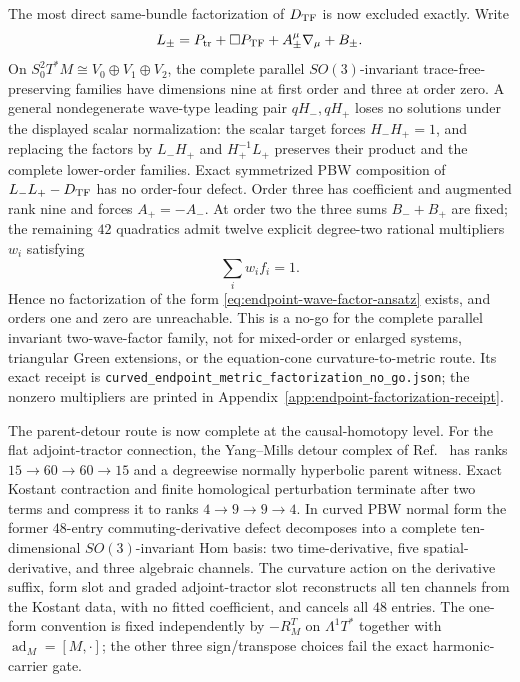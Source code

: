 \documentclass[11pt]{article}
\theoremstyle{definition}
\theoremstyle{remark}
\begin{document}
The most direct same-bundle factorization of $D_{\rm TF}$ is now excluded
exactly.  Write
\begin{equation}\label{eq:endpoint-wave-factor-ansatz}
 L_\pm=P_{\rm tr}+\Box P_{\rm TF}
       +A_\pm^\mu\nabla_\mu+B_\pm .
\end{equation}
On $S^2_0T^*M\cong V_0\oplus V_1\oplus V_2$, the complete parallel
$SO(3)$-invariant trace-free-preserving families have dimensions nine at
first order and three at order zero.  A general nondegenerate wave-type
leading pair $qH_-,qH_+$ loses no solutions under the displayed scalar
normalization: the scalar target forces $H_-H_+=1$, and replacing the factors
by $L_-H_+$ and $H_+^{-1}L_+$ preserves their product and the complete
lower-order families.  Exact symmetrized PBW composition of
$L_-L_+-D_{\rm TF}$ has no order-four defect.  Order three has coefficient and
augmented rank nine and forces $A_+=-A_-$.  At order two the three sums
$B_-+B_+$ are fixed; the remaining $42$ quadratics admit twelve explicit
degree-two rational multipliers $w_i$ satisfying
\begin{equation}\label{eq:endpoint-factor-nullstellensatz}
 \boxed{\sum_i w_i f_i=1.}
\end{equation}
Hence no factorization of the form \eqref{eq:endpoint-wave-factor-ansatz}
exists, and orders one and zero are unreachable.  This is a no-go for the
complete parallel invariant two-wave-factor family, not for mixed-order or
enlarged systems, triangular Green extensions, or the equation-cone
curvature-to-metric route.  Its exact receipt is
\texttt{curved\_endpoint\_metric\_factorization\_no\_go.json}; the nonzero
multipliers are printed in
Appendix~\ref{app:endpoint-factorization-receipt}.

The parent-detour route is now complete at the causal-homotopy level.  For
the flat adjoint-tractor connection, the Yang--Mills detour complex of
Ref.~\cite{GoverSombergSoucek} has ranks $15\to60\to60\to15$ and a
degreewise normally hyperbolic parent witness.  Exact Kostant contraction
and finite homological perturbation terminate after two terms and compress
it to ranks $4\to9\to9\to4$.  In curved PBW normal form the former
$48$-entry commuting-derivative defect decomposes into a complete
ten-dimensional $SO(3)$-invariant Hom basis: two time-derivative, five
spatial-derivative, and three algebraic channels.  The curvature action on
the derivative suffix, form slot and graded adjoint-tractor slot reconstructs
all ten channels from the Kostant data, with no fitted coefficient, and
cancels all $48$ entries.  The one-form convention is fixed independently by
$-R_M^T$ on $\Lambda^1T^*$ together with $\operatorname{ad}_M=[M,\cdot]$;
the other three sign/transpose choices fail the exact harmonic-carrier gate.
\end{document}
